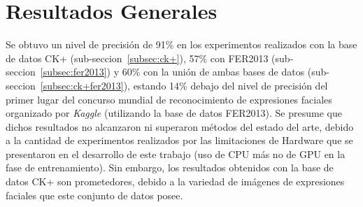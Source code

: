 \chapter*{Resultados Generales}

Se obtuvo un nivel de precisión de 91\% en los experimentos realizados con la base de datos CK+ (sub-seccion~\ref{subsec:ck+}), 57\% con FER2013 (sub-seccion~\ref{subsec:fer2013}) y 60\% con la unión de ambas bases de datos (sub-seccion~\ref{subsec:ck+fer2013}), estando 14\% debajo del nivel de precisión del primer lugar del concurso mundial de reconocimiento de expresiones faciales organizado por \textit{Kaggle} (utilizando la base de datos FER2013). Se presume que dichos resultados no alcanzaron ni superaron métodos del estado del arte, debido a la cantidad de experimentos realizados por las limitaciones de Hardware que se presentaron en el desarrollo de este trabajo (uso de CPU más no de GPU en la fase de entrenamiento). Sin embargo, los resultados obtenidos con la base de datos CK+ son prometedores, debido a la variedad de imágenes de expresiones faciales  que este conjunto de datos posee.
